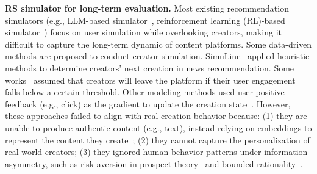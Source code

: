\textbf{RS simulator for long-term evaluation.} 
Most existing recommendation simulators (e.g., LLM-based simulator~\cite{wang2023recagent, zhang2024agent4rec}, reinforcement learning (RL)-based simulator~\cite{ shi2019virtualtaobao,ie2019recsim}) focus on user simulation while overlooking creators, making it difficult to capture the long-term dynamic of content platforms.
Some data-driven methods are proposed to conduct creator simulation.  SimuLine~\cite{zhang2023simuLine} applied heuristic methods to determine creators' next creation in news recommendation. 
Some works~\cite{mladenov2021recsimng, mladenov2020optimizing_long-term} assumed that creators will leave the platform if their user engagement falls below a certain threshold.
Other modeling methods used user positive feedback (e.g., click) as the gradient to update the creation state~\cite{lin2024cfd, yao2024uwo, zhan2021toward_content_provider_rec}.
However, these approaches failed to align with real creation behavior because: (1) they are unable to produce authentic content (e.g., text), instead relying on embeddings to represent the content they create~\cite{zhang2023simuLine}; (2) they cannot capture the personalization of real-world creators; (3) they ignored human behavior patterns under information asymmetry, such as risk aversion in prospect theory~\cite{kahneman2013prospecttheory} and bounded rationality~\cite{selten1990bounded_rationality}.


